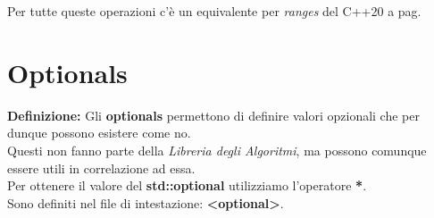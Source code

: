 \fleuron

\textsf{\small Per tutte queste operazioni c'è un equivalente per \emph{ranges} del C++20 a pag. \pageref{ranges_uninitialized_memory}} \\


\newpage

\label{optionals}

\section{Optionals}

\textsf{\small \textbf{Definizione: } Gli \textbf{optionals} permettono di definire valori opzionali che per dunque possono esistere come no.} \\

\textsf{\small Questi non fanno parte della \emph{Libreria degli Algoritmi}, ma possono comunque essere utili in correlazione ad essa.} \\

\textsf{\small Per ottenere il valore del \textbf{std::optional} utilizziamo l'operatore \textbf{*}. } \\ %

\textsf{\small Sono definiti nel file di intestazione: \textbf{<optional>}.} \\

